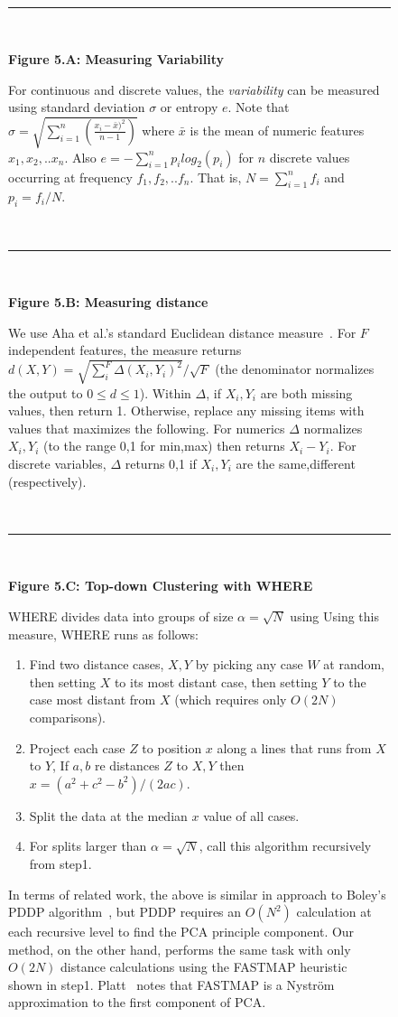 \documentclass{sig-alternate}
\begin{document}
	\begin{figure}[!t]
	\begin{shaded}
  ~\hrule~
  
 {\bf Figure 5.A: Measuring Variability} 
	
	For  continuous and discrete values,
the {\em variability} can be measured using standard deviation $\sigma$ or entropy $e$.
Note that \mbox{$\sigma = \sqrt{\sum^n_{i=1} \left( \frac{x_i - \bar{x})^2}{n-1}\right)}$}
where $\bar{x}$ is the mean of  numeric features $x_1,x_2,..x_n$.
Also \mbox{$e = - \sum^n_{i=1} p_i \mathit{log}_2(p_i)$} 
for  $n$ discrete values occurring at frequency
$f_1,f_2,.. f_n$. That is, \mbox{$N = \sum^n_{i=1} f_i$} and $p_i = f_i/N$.

  ~\hrule~
	
	{\bf Figure 5.B: Measuring distance}
	
	We use
		 Aha et al.'s standard Euclidean distance measure~\cite{aha91}.  For $F$ independent features, the measure returns   $d(X,Y)=\sqrt{\sum_i^F  \Delta(X_i,Y_i)^2}/\sqrt{F}$
			(the denominator normalizes the output to $0 \le d \le 1$).
			Within $\Delta$, if   $X_i,Y_i$ are both missing  values, then  return 1.
			Otherwise, replace any  missing items with values that maximizes the following.
			For numerics $\Delta$ normalizes $X_i,Y_i$ (to the range 0,1 for min,max) then
			returns 
			$X_i - Y_i$. For discrete variables, $\Delta$ returns 0,1 if $X_i,Y_i$ are the
			same,different (respectively).  

 ~\hrule~
 
	{\bf Figure 5.C: Top-down Clustering with WHERE}
	
				WHERE  divides data into  groups of size $\alpha=\sqrt{N}$ using 
		Using this measure, WHERE runs as follows:
		\begin{enumerate}[leftmargin=3mm]
			\item Find   two   distance cases,  $X,Y$
			by picking any case $W$ at random, then setting $X$ to its most
			distant case, then setting $Y$ to the case most distant from
			$X$
			(which requires only $O(2N)$ comparisons).
			\item Project each case $Z$
			to position $x$ along a    lines that  runs from $X$ to $Y$, If $a,b$ re distances  $Z$ to $X,Y$  then  $x = (a^2+c^2 - b^2)/(2ac)$.
			\item Split the data at the median $x$ value of all cases.
			\item For   splits larger than  $\alpha=\sqrt{N}$, call this algorithm recursively  from step1.
		\end{enumerate}
 In terms of related work,
	  the above is similar in approach to Boley's PDDP algorithm~\cite{boley98}, but PDDP requires an $O(N^2)$ calculation
	  at each recursive level to find the PCA principle component. Our method, on the other hand,
	  performs the same task with only $O(2N)$ distance calculations 	using the 
	  FASTMAP heuristic~\cite{Faloutsos1995} shown in step1. Platt~\cite{platt05} notes that FASTMAP is a  Nystr\"om approximation to the first component of PCA.  
	  

\end{shaded}
\end{figure}
\end{document}
